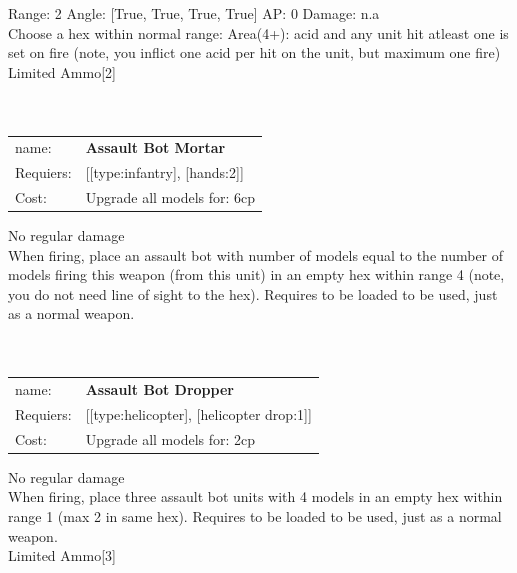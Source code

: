 Range: 2  Angle: [True, True, True, True] AP: 0 Damage: n.a \\
Choose a hex within normal range: Area(4+): acid and any unit hit atleast one is set on fire (note, you inflict one acid per hit on the unit, but maximum one fire)\\ 
Limited Ammo[2]\\ 








\ \\
\ \\
\begin{tabular}{ll}
name: & {\bf Assault Bot Mortar } \\
Requiers: & [[type:infantry], [hands:2]] \\
Cost: & Upgrade all models for: 6cp \\
\end{tabular}

No regular damage\\ 
When firing, place an assault bot with number of models equal to the number of models firing this weapon (from this unit) in an empty hex within range 4 (note, you do not need line of sight to the hex). Requires to be loaded to be used, just as a normal weapon.\\ 









\ \\
\ \\
\begin{tabular}{ll}
name: & {\bf Assault Bot Dropper } \\
Requiers: & [[type:helicopter], [helicopter drop:1]] \\
Cost: & Upgrade all models for: 2cp \\
\end{tabular}

No regular damage\\ 
When firing, place three assault bot units with 4 models in an empty hex within range 1 (max 2 in same hex). Requires to be loaded to be used, just as a normal weapon.\\ 
Limited Ammo[3]\\ 









